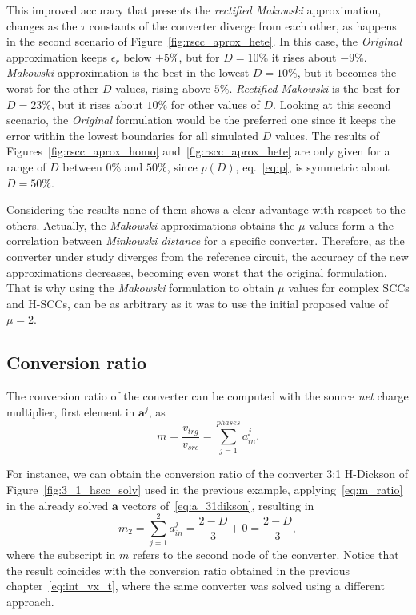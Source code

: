 This improved accuracy that presents the \emph{rectified Makowski} approximation, changes as the $\tau$ constants of the converter diverge from each other, as happens in the second scenario of Figure~\ref{fig:rscc_aprox_hete}. In this case, the \emph{Original} approximation keeps $\epsilon_r$ below $\pm5\%$, but for $D=10\%$ it rises about $-9\%$. \emph{Makowski} approximation is the best in the lowest $D=10\%$, but it becomes the worst for the other $D$ values, rising above $5\%$. \emph{Rectified Makowski} is the best for $D=23\%$, but it rises about $10\%$ for other values of $D$. Looking at this second scenario, the \emph{Original} formulation would be the preferred one since it keeps the error within the lowest boundaries for all simulated $D$ values. The results of Figures~\ref{fig:rscc_aprox_homo} and~\ref{fig:rscc_aprox_hete} are only given for a range of $D$ between $0\%$ and $50\%$, since $p(D)$, eq.~\eqref{eq:p}, is symmetric about $D=50\%$.

Considering the results  none of them shows a clear advantage with respect to the others. Actually, the \emph{Makowski} approximations obtains the $\mu$ values form a the correlation between \emph{Minkowski distance} for a specific  converter. Therefore, as the converter under study diverges from the reference circuit, the accuracy of the new approximations decreases, becoming even worst that the original formulation. That is why using the \emph{Makowski} formulation to obtain $\mu$ values for complex SCCs and H-SCCs, can be as arbitrary as it was to use the initial proposed value of $\mu=2$.

\afterpage{\clearpage}

\subsection{Conversion ratio}

The conversion ratio of the converter can be computed with the source \emph{net} charge multiplier, first element in $\mathbf{a}^j$, as
\begin{equation}
m=\frac{{v_{trg}}}{v_{src}}=\sum_{j=1}^{phases}a_{in}^j.
\label{eq:m_ratio}
\end{equation}

For instance, we can obtain the conversion ratio of the converter 3:1 H-Dickson of Figure~\ref{fig:3_1_hscc_solv} used in the previous example, applying~\eqref{eq:m_ratio} in the already solved $\mathbf{a}$ vectors of~\eqref{eq:a_31dikson}, resulting in
\begin{equation}
m_2= \sum_{j=1}^{2}a_{in}^j= \frac{2-D}{3} + 0 = \frac{2-D}{3},
\label{eq:m_31dickson}
\end{equation}
where the subscript in $m$ refers to the second node of the converter. Notice that the result coincides with the conversion ratio obtained in the previous chapter~\eqref{eq:int_vx_t}, where the same converter was solved using a different approach.

\afterpage{\clearpage}
